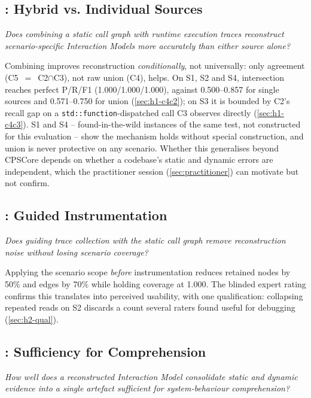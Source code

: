 \subsection*{\rqone: Hybrid vs. Individual Sources}

\textit{Does combining a static call graph with runtime execution traces
reconstruct scenario-specific Interaction Models more accurately than
either source alone?}

Combining improves reconstruction \emph{conditionally}, not universally:
only agreement (C5~$=$~C2$\cap$C3), not raw union (C4), helps. On S1,
S2 and S4, intersection reaches perfect P/R/F1
(1.000/1.000/1.000), against 0.500--0.857 for single sources and
0.571--0.750 for union (\cref{sec:h1-c4c2}); on S3 it is bounded by
C2's recall gap on a \texttt{std::function}-dispatched call C3 observes
directly (\cref{sec:h1-c4c3}). S1 and S4 -- found-in-the-wild instances
of the same test, not constructed for this evaluation -- show the
mechanism holds without special construction, and union is never
protective on any scenario. Whether this generalises beyond CPSCore
depends on whether a codebase's static and dynamic errors are
independent, which the practitioner session (\cref{sec:practitioner})
can motivate but not confirm.

\subsection*{\rqtwo: Guided Instrumentation}

\textit{Does guiding trace collection with the static call graph remove
reconstruction noise without losing scenario coverage?}

Applying the scenario scope \emph{before} instrumentation reduces
retained nodes by 50\% and edges by 70\% while holding coverage at
1.000. The blinded expert rating confirms this translates into
perceived usability, with one qualification: collapsing repeated reads
on S2 discards a count several raters found useful for debugging
(\cref{sec:h2-qual}).

\subsection*{\rqthree: Sufficiency for Comprehension}

\textit{How well does a reconstructed \sysml Interaction Model
consolidate static and dynamic evidence into a single artefact sufficient
for system-behaviour comprehension?}

